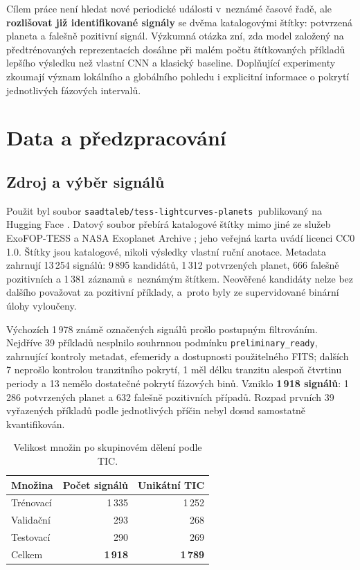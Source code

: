 \documentclass[11pt,a4paper]{article}
\newcommand{\dataset}{\texttt{saadtaleb/tess-lightcurves-planets}}
\newcommand{\code}[1]{\texttt{#1}}
\begin{document}
Cílem práce není hledat nové periodické události v~neznámé časové řadě, ale \textbf{rozlišovat již identifikované signály} se dvěma katalogovými štítky: potvrzená planeta a falešně pozitivní signál. Výzkumná otázka zní, zda model založený na předtrénovaných reprezentacích dosáhne při malém počtu štítkovaných příkladů lepšího výsledku než vlastní CNN a klasický baseline. Doplňující experimenty zkoumají význam lokálního a globálního pohledu i explicitní informace o pokrytí jednotlivých fázových intervalů.

\section{Data a předzpracování}
\subsection{Zdroj a výběr signálů}
Použit byl soubor \dataset\ publikovaný na Hugging Face \cite{dataset}. Datový soubor přebírá katalogové štítky mimo jiné ze služeb ExoFOP-TESS a NASA Exoplanet Archive \cite{exofop,nea}; jeho veřejná karta uvádí licenci CC0 1.0. Štítky jsou katalogové, nikoli výsledky vlastní ruční anotace. Metadata zahrnují 13\,254 signálů: 9\,895 kandidátů, 1\,312 potvrzených planet, 666 falešně pozitivních a 1\,381 záznamů s~neznámým štítkem. Neověřené kandidáty nelze bez dalšího považovat za pozitivní příklady, a~proto byly ze supervidované binární úlohy vyloučeny.

Výchozích 1\,978 známě označených signálů prošlo postupným filtrováním. Nejdříve 39 příkladů nesplnilo souhrnnou podmínku \code{preliminary\_ready}, zahrnující kontroly metadat, efemeridy a dostupnosti použitelného FITS; dalších 7 neprošlo kontrolou tranzitního pokrytí, 1 měl délku tranzitu alespoň čtvrtinu periody a 13 nemělo dostatečné pokrytí fázových binů. Vzniklo \textbf{1\,918 signálů}: 1\,286 potvrzených planet a 632 falešně pozitivních případů. Rozpad prvních 39 vyřazených příkladů podle jednotlivých příčin nebyl dosud samostatně kvantifikován.

\begin{table}[H]
\centering\small
\caption{Velikost množin po skupinovém dělení podle TIC.}
\label{tab:splits}
\begin{tabular}{lrr}
\toprule
Množina & Počet signálů & Unikátní TIC \\
\midrule
Trénovací & 1\,335 & 1\,252 \\
Validační & 293 & 268 \\
Testovací & 290 & 269 \\
\midrule
Celkem & \textbf{1\,918} & \textbf{1\,789} \\
\bottomrule
\end{tabular}
\end{table}
\end{document}
